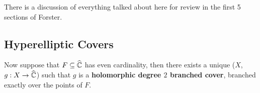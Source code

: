 \documentclass{article}
\begin{document}
\begin{remark}
    There is a discussion of everything talked about here for review in the first 5 sections of Forster.
\end{remark}

\subsection{Hyperelliptic Covers}

\begin{proposition}
Now suppose that $F \subseteq \widehat{\mathbb{C}}$ has even cardinality, then there exists a unique ($X$, $g: X \to \widehat{\mathbb{C}}$) such that $g$ is a \textbf{holomorphic degree $2$ branched cover}, branched exactly over the points of $F$.    
\end{proposition}
\end{document}
